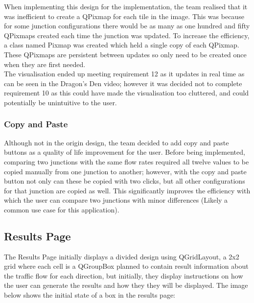 \documentclass{article}
\begin{document}
            When implementing this design for the implementation, the team realised that it was inefficient to create a QPixmap for each tile in the image. This was because for some junction configurations there would be as many as one hundred and fifty QPixmaps created each time the junction was updated. To increase the efficiency, a class named Pixmap was created which held a single copy of each QPixmap. These QPixmaps are persistent between updates so only need to be created once when they are first needed.\\

            The visualisation ended up meeting requirement 12 as it updates in real time as can be seen in the Dragon's Den video; however it was decided not to complete requirement 10 as this could have made the visualisation too cluttered, and could potentially be unintuitive to the user.
        
        \subsubsection{Copy and Paste}
            Although not in the origin design, the team decided to add copy and paste buttons as a quality of life improvement for the user.
            Before being implemented, comparing two junctions with the same flow rates required all twelve values to be copied manually from one junction to another; however, with the copy and paste button not only can these be copied with two clicks, but all other configurations for that junction are copied as well. 
            This significantly improves the efficiency with which the user can compare two junctions with minor differences (Likely a common use case for this application).



    \subsection{Results Page}

    The Results Page initially displays a divided design using QGridLayout, a 2x2 grid where each cell is a QGroupBox planned to contain result information about the traffic flow for each direction, but initially,
    they display instructions on how the user can generate the results and how they they will be displayed. The image below shows the initial state of a box in the results page:
\end{document}
